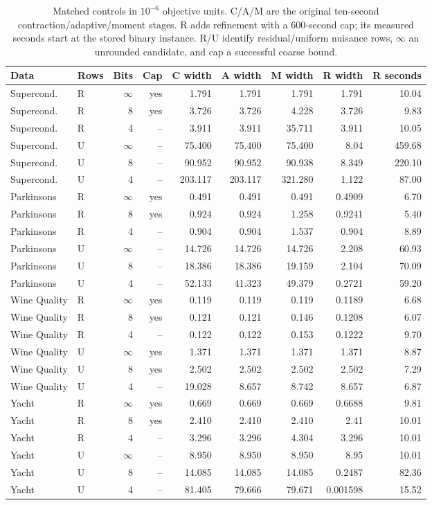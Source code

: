 \begin{table}[t]\centering\small\setlength{\tabcolsep}{4pt}
\caption{Matched controls in $10^{-6}$ objective units. C/A/M are the original ten-second contraction/adaptive/moment stages. R adds refinement with a 600-second cap; its measured seconds start at the stored binary instance. R/U identify residual/uniform nuisance rows, $\infty$ an unrounded candidate, and cap a successful coarse bound.}
\label{tab:matched-v89}
\begin{tabular}{llrrrrrrr}\toprule
Data&Rows&Bits&Cap&C width&A width&M width&R width&R seconds\\\midrule
Supercond. & R & $\infty$ & yes & 1.791 & 1.791 & 1.791 & 1.791 & 10.04\\
Supercond. & R & 8 & yes & 3.726 & 3.726 & 4.228 & 3.726 & 9.83\\
Supercond. & R & 4 & -- & 3.911 & 3.911 & 35.711 & 3.911 & 10.05\\
Supercond. & U & $\infty$ & -- & 75.400 & 75.400 & 75.400 & 8.04 & 459.68\\
Supercond. & U & 8 & -- & 90.952 & 90.952 & 90.938 & 8.349 & 220.10\\
Supercond. & U & 4 & -- & 203.117 & 203.117 & 321.280 & 1.122 & 87.00\\
Parkinsons & R & $\infty$ & yes & 0.491 & 0.491 & 0.491 & 0.4909 & 6.70\\
Parkinsons & R & 8 & yes & 0.924 & 0.924 & 1.258 & 0.9241 & 5.40\\
Parkinsons & R & 4 & -- & 0.904 & 0.904 & 1.537 & 0.904 & 8.89\\
Parkinsons & U & $\infty$ & -- & 14.726 & 14.726 & 14.726 & 2.208 & 60.93\\
Parkinsons & U & 8 & -- & 18.386 & 18.386 & 19.159 & 2.104 & 70.09\\
Parkinsons & U & 4 & -- & 52.133 & 41.323 & 49.379 & 0.2721 & 59.20\\
Wine Quality & R & $\infty$ & yes & 0.119 & 0.119 & 0.119 & 0.1189 & 6.68\\
Wine Quality & R & 8 & yes & 0.121 & 0.121 & 0.146 & 0.1208 & 6.07\\
Wine Quality & R & 4 & -- & 0.122 & 0.122 & 0.153 & 0.1222 & 9.70\\
Wine Quality & U & $\infty$ & yes & 1.371 & 1.371 & 1.371 & 1.371 & 8.87\\
Wine Quality & U & 8 & yes & 2.502 & 2.502 & 2.502 & 2.502 & 7.29\\
Wine Quality & U & 4 & -- & 19.028 & 8.657 & 8.742 & 8.657 & 6.87\\
Yacht & R & $\infty$ & yes & 0.669 & 0.669 & 0.669 & 0.6688 & 9.81\\
Yacht & R & 8 & yes & 2.410 & 2.410 & 2.410 & 2.41 & 10.01\\
Yacht & R & 4 & -- & 3.296 & 3.296 & 4.304 & 3.296 & 10.01\\
Yacht & U & $\infty$ & -- & 8.950 & 8.950 & 8.950 & 8.95 & 10.01\\
Yacht & U & 8 & -- & 14.085 & 14.085 & 14.085 & 0.2487 & 82.36\\
Yacht & U & 4 & -- & 81.405 & 79.666 & 79.671 & 0.001598 & 15.52\\
\bottomrule\end{tabular}\end{table}
